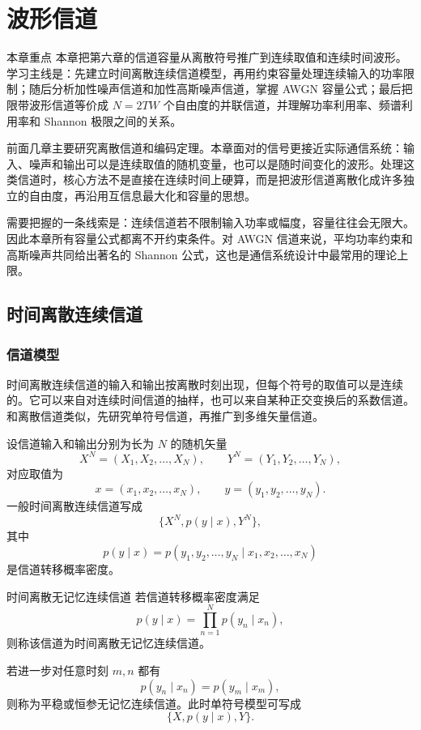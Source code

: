 \section{波形信道}

\begin{remarkBox}{本章重点}
本章把第六章的信道容量从离散符号推广到连续取值和连续时间波形。学习主线是：先建立时间离散连续信道模型，再用约束容量处理连续输入的功率限制；随后分析加性噪声信道和加性高斯噪声信道，掌握 AWGN 容量公式；最后把限带波形信道等价成 $N=2TW$ 个自由度的并联信道，并理解功率利用率、频谱利用率和 Shannon 极限之间的关系。
\end{remarkBox}

前面几章主要研究离散信道和编码定理。本章面对的信号更接近实际通信系统：输入、噪声和输出可以是连续取值的随机变量，也可以是随时间变化的波形。处理这类信道时，核心方法不是直接在连续时间上硬算，而是把波形信道离散化成许多独立的自由度，再沿用互信息最大化和容量的思想。

需要把握的一条线索是：连续信道若不限制输入功率或幅度，容量往往会无限大。因此本章所有容量公式都离不开约束条件。对 AWGN 信道来说，平均功率约束和高斯噪声共同给出著名的 Shannon 公式，这也是通信系统设计中最常用的理论上限。

\subsection{时间离散连续信道}

\subsubsection{信道模型}

时间离散连续信道的输入和输出按离散时刻出现，但每个符号的取值可以是连续的。它可以来自对连续时间信道的抽样，也可以来自某种正交变换后的系数信道。和离散信道类似，先研究单符号信道，再推广到多维矢量信道。

设信道输入和输出分别为长为 $N$ 的随机矢量
\[
X^N=(X_1,X_2,\dots,X_N),
\qquad
Y^N=(Y_1,Y_2,\dots,Y_N),
\]
对应取值为
\[
x=(x_1,x_2,\dots,x_N),
\qquad
y=(y_1,y_2,\dots,y_N).
\]
一般时间离散连续信道写成
\[
\{X^N,p(y\mid x),Y^N\},
\]
其中
\[
p(y\mid x)=p(y_1,y_2,\dots,y_N\mid x_1,x_2,\dots,x_N)
\]
是信道转移概率密度。

\begin{definitionBox}{时间离散无记忆连续信道}
若信道转移概率密度满足
\[
p(y\mid x)=\prod_{n=1}^{N}p(y_n\mid x_n),
\]
则称该信道为时间离散无记忆连续信道。

若进一步对任意时刻 $m,n$ 都有
\[
p(y_n\mid x_n)=p(y_m\mid x_m),
\]
则称为平稳或恒参无记忆连续信道。此时单符号模型可写成
\[
\{X,p(y\mid x),Y\}.
\]
\end{definitionBox}

